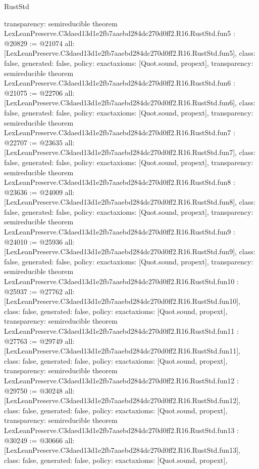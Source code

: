 \begin{lexlean}{RustStd}
\begin{coremodule}
{  transparency: semireducible
}
theorem LexLeanPreserve.C3daed13d1e2fb7aaebd284dc270d0ff2.R16.RustStd.fun5 : @20829 := @21074 {
  all: [LexLeanPreserve.C3daed13d1e2fb7aaebd284dc270d0ff2.R16.RustStd.fun5],
  class: false,
  generated: false,
  policy: exact{axioms: [Quot.sound, propext]},
  transparency: semireducible
}
theorem LexLeanPreserve.C3daed13d1e2fb7aaebd284dc270d0ff2.R16.RustStd.fun6 : @21075 := @22706 {
  all: [LexLeanPreserve.C3daed13d1e2fb7aaebd284dc270d0ff2.R16.RustStd.fun6],
  class: false,
  generated: false,
  policy: exact{axioms: [Quot.sound, propext]},
  transparency: semireducible
}
theorem LexLeanPreserve.C3daed13d1e2fb7aaebd284dc270d0ff2.R16.RustStd.fun7 : @22707 := @23635 {
  all: [LexLeanPreserve.C3daed13d1e2fb7aaebd284dc270d0ff2.R16.RustStd.fun7],
  class: false,
  generated: false,
  policy: exact{axioms: [Quot.sound, propext]},
  transparency: semireducible
}
theorem LexLeanPreserve.C3daed13d1e2fb7aaebd284dc270d0ff2.R16.RustStd.fun8 : @23636 := @24009 {
  all: [LexLeanPreserve.C3daed13d1e2fb7aaebd284dc270d0ff2.R16.RustStd.fun8],
  class: false,
  generated: false,
  policy: exact{axioms: [Quot.sound, propext]},
  transparency: semireducible
}
theorem LexLeanPreserve.C3daed13d1e2fb7aaebd284dc270d0ff2.R16.RustStd.fun9 : @24010 := @25936 {
  all: [LexLeanPreserve.C3daed13d1e2fb7aaebd284dc270d0ff2.R16.RustStd.fun9],
  class: false,
  generated: false,
  policy: exact{axioms: [Quot.sound, propext]},
  transparency: semireducible
}
theorem LexLeanPreserve.C3daed13d1e2fb7aaebd284dc270d0ff2.R16.RustStd.fun10 : @25937 := @27762 {
  all: [LexLeanPreserve.C3daed13d1e2fb7aaebd284dc270d0ff2.R16.RustStd.fun10],
  class: false,
  generated: false,
  policy: exact{axioms: [Quot.sound, propext]},
  transparency: semireducible
}
theorem LexLeanPreserve.C3daed13d1e2fb7aaebd284dc270d0ff2.R16.RustStd.fun11 : @27763 := @29749 {
  all: [LexLeanPreserve.C3daed13d1e2fb7aaebd284dc270d0ff2.R16.RustStd.fun11],
  class: false,
  generated: false,
  policy: exact{axioms: [Quot.sound, propext]},
  transparency: semireducible
}
theorem LexLeanPreserve.C3daed13d1e2fb7aaebd284dc270d0ff2.R16.RustStd.fun12 : @29750 := @30248 {
  all: [LexLeanPreserve.C3daed13d1e2fb7aaebd284dc270d0ff2.R16.RustStd.fun12],
  class: false,
  generated: false,
  policy: exact{axioms: [Quot.sound, propext]},
  transparency: semireducible
}
theorem LexLeanPreserve.C3daed13d1e2fb7aaebd284dc270d0ff2.R16.RustStd.fun13 : @30249 := @30666 {
  all: [LexLeanPreserve.C3daed13d1e2fb7aaebd284dc270d0ff2.R16.RustStd.fun13],
  class: false,
  generated: false,
  policy: exact{axioms: [Quot.sound, propext]},
}
\end{coremodule}
\end{lexlean}

